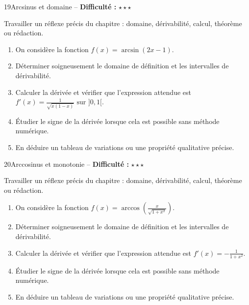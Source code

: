\documentclass[11pt,a4paper]{article}
\newcommand{\etoiles}[1]{\textbf{Difficulté :} #1}
\begin{document}
\begin{exobox}{19}{Arcsinus et domaine -- \etoiles{$\star\star\star$}}

\begin{objectifbox}
Travailler un réflexe précis du chapitre : domaine, dérivabilité, calcul, théorème ou rédaction.
\end{objectifbox}

\begin{enumerate}

\item On considère la fonction $f(x)=\arcsin(2x-1)$.

\item Déterminer soigneusement le domaine de définition et les intervalles de dérivabilité.

\item Calculer la dérivée et vérifier que l'expression attendue est $f'(x)=\frac{1}{\sqrt{x(1-x)}}\text{ sur }]0,1[$.

\item Étudier le signe de la dérivée lorsque cela est possible sans méthode numérique.

\item En déduire un tableau de variations ou une propriété qualitative précise.

\end{enumerate}

\end{exobox}


\begin{exobox}{20}{Arccosinus et monotonie -- \etoiles{$\star\star\star$}}

\begin{objectifbox}
Travailler un réflexe précis du chapitre : domaine, dérivabilité, calcul, théorème ou rédaction.
\end{objectifbox}

\begin{enumerate}

\item On considère la fonction $f(x)=\arccos\left(\frac{x}{\sqrt{1+x^2}}\right)$.

\item Déterminer soigneusement le domaine de définition et les intervalles de dérivabilité.

\item Calculer la dérivée et vérifier que l'expression attendue est $f'(x)=-\frac{1}{1+x^2}$.

\item Étudier le signe de la dérivée lorsque cela est possible sans méthode numérique.

\item En déduire un tableau de variations ou une propriété qualitative précise.

\end{enumerate}

\end{exobox}
\end{document}
